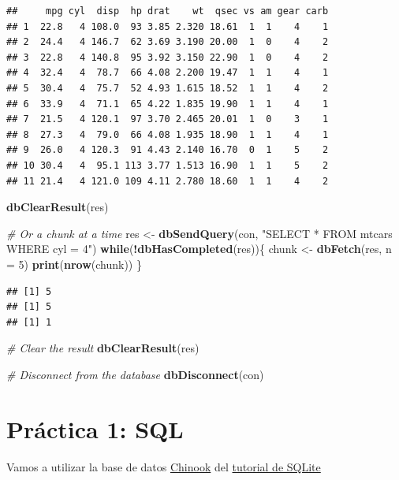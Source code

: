 \documentclass[]{book}
\newenvironment{Shaded}{\begin{snugshade}}{\end{snugshade}}
\newcommand{\KeywordTok}[1]{\textcolor[rgb]{0.13,0.29,0.53}{\textbf{#1}}}
\newcommand{\DataTypeTok}[1]{\textcolor[rgb]{0.13,0.29,0.53}{#1}}
\newcommand{\DecValTok}[1]{\textcolor[rgb]{0.00,0.00,0.81}{#1}}
\newcommand{\StringTok}[1]{\textcolor[rgb]{0.31,0.60,0.02}{#1}}
\newcommand{\CommentTok}[1]{\textcolor[rgb]{0.56,0.35,0.01}{\textit{#1}}}
\newcommand{\ControlFlowTok}[1]{\textcolor[rgb]{0.13,0.29,0.53}{\textbf{#1}}}
\newcommand{\OperatorTok}[1]{\textcolor[rgb]{0.81,0.36,0.00}{\textbf{#1}}}
\newcommand{\NormalTok}[1]{#1}
\begin{document}
\begin{verbatim}
##     mpg cyl  disp  hp drat    wt  qsec vs am gear carb
## 1  22.8   4 108.0  93 3.85 2.320 18.61  1  1    4    1
## 2  24.4   4 146.7  62 3.69 3.190 20.00  1  0    4    2
## 3  22.8   4 140.8  95 3.92 3.150 22.90  1  0    4    2
## 4  32.4   4  78.7  66 4.08 2.200 19.47  1  1    4    1
## 5  30.4   4  75.7  52 4.93 1.615 18.52  1  1    4    2
## 6  33.9   4  71.1  65 4.22 1.835 19.90  1  1    4    1
## 7  21.5   4 120.1  97 3.70 2.465 20.01  1  0    3    1
## 8  27.3   4  79.0  66 4.08 1.935 18.90  1  1    4    1
## 9  26.0   4 120.3  91 4.43 2.140 16.70  0  1    5    2
## 10 30.4   4  95.1 113 3.77 1.513 16.90  1  1    5    2
## 11 21.4   4 121.0 109 4.11 2.780 18.60  1  1    4    2
\end{verbatim}

\begin{Shaded}
\begin{Highlighting}[]
\KeywordTok{dbClearResult}\NormalTok{(res)}

\CommentTok{# Or a chunk at a time}
\NormalTok{res <-}\StringTok{ }\KeywordTok{dbSendQuery}\NormalTok{(con, }\StringTok{"SELECT * FROM mtcars WHERE cyl = 4"}\NormalTok{)}
\ControlFlowTok{while}\NormalTok{(}\OperatorTok{!}\KeywordTok{dbHasCompleted}\NormalTok{(res))\{}
\NormalTok{  chunk <-}\StringTok{ }\KeywordTok{dbFetch}\NormalTok{(res, }\DataTypeTok{n =} \DecValTok{5}\NormalTok{)}
  \KeywordTok{print}\NormalTok{(}\KeywordTok{nrow}\NormalTok{(chunk))}
\NormalTok{\}}
\end{Highlighting}
\end{Shaded}

\begin{verbatim}
## [1] 5
## [1] 5
## [1] 1
\end{verbatim}

\begin{Shaded}
\begin{Highlighting}[]
\CommentTok{# Clear the result}
\KeywordTok{dbClearResult}\NormalTok{(res)}

\CommentTok{# Disconnect from the database}
\KeywordTok{dbDisconnect}\NormalTok{(con)}
\end{Highlighting}
\end{Shaded}

\section{Práctica 1: SQL}\label{pruxe1ctica-1-sql}

Vamos a utilizar la base de datos
\href{https://www.sqlitetutorial.net/wp-content/uploads/2018/03/chinook.zip}{Chinook}
del
\href{https://www.sqlitetutorial.net/sqlite-sample-database/}{tutorial
de SQLite}
\end{document}
